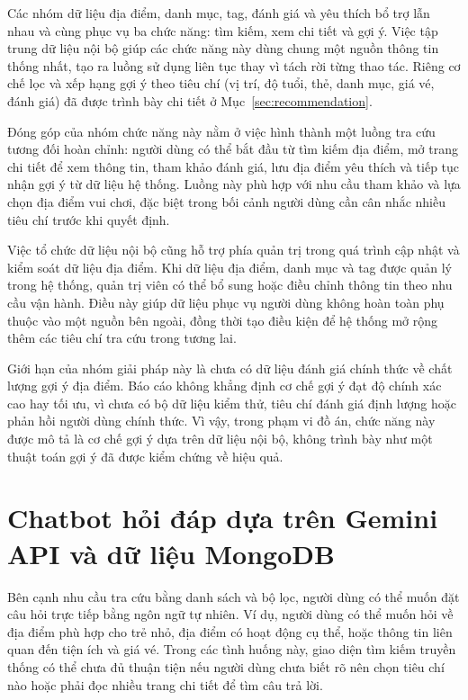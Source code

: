 \documentclass[../DoAn.tex]{subfiles}
\begin{document}
Các nhóm dữ liệu địa điểm, danh mục, tag, đánh giá và yêu thích bổ trợ lẫn nhau và cùng phục vụ ba chức năng: tìm kiếm, xem chi tiết và gợi ý. Việc tập trung dữ liệu nội bộ giúp các chức năng này dùng chung một nguồn thông tin thống nhất, tạo ra luồng sử dụng liên tục thay vì tách rời từng thao tác. Riêng cơ chế lọc và xếp hạng gợi ý theo tiêu chí (vị trí, độ tuổi, thẻ, danh mục, giá vé, đánh giá) đã được trình bày chi tiết ở Mục~\ref{sec:recommendation}.

Đóng góp của nhóm chức năng này nằm ở việc hình thành một luồng tra cứu tương đối hoàn chỉnh: người dùng có thể bắt đầu từ tìm kiếm địa điểm, mở trang chi tiết để xem thông tin, tham khảo đánh giá, lưu địa điểm yêu thích và tiếp tục nhận gợi ý từ dữ liệu hệ thống. Luồng này phù hợp với nhu cầu tham khảo và lựa chọn địa điểm vui chơi, đặc biệt trong bối cảnh người dùng cần cân nhắc nhiều tiêu chí trước khi quyết định.

Việc tổ chức dữ liệu nội bộ cũng hỗ trợ phía quản trị trong quá trình cập nhật và kiểm soát dữ liệu địa điểm. Khi dữ liệu địa điểm, danh mục và tag được quản lý trong hệ thống, quản trị viên có thể bổ sung hoặc điều chỉnh thông tin theo nhu cầu vận hành. Điều này giúp dữ liệu phục vụ người dùng không hoàn toàn phụ thuộc vào một nguồn bên ngoài, đồng thời tạo điều kiện để hệ thống mở rộng thêm các tiêu chí tra cứu trong tương lai.

Giới hạn của nhóm giải pháp này là chưa có dữ liệu đánh giá chính thức về chất lượng gợi ý địa điểm. Báo cáo không khẳng định cơ chế gợi ý đạt độ chính xác cao hay tối ưu, vì chưa có bộ dữ liệu kiểm thử, tiêu chí đánh giá định lượng hoặc phản hồi người dùng chính thức. Vì vậy, trong phạm vi đồ án, chức năng này được mô tả là cơ chế gợi ý dựa trên dữ liệu nội bộ, không trình bày như một thuật toán gợi ý đã được kiểm chứng về hiệu quả.

\section{Chatbot hỏi đáp dựa trên Gemini API và dữ liệu MongoDB}

Bên cạnh nhu cầu tra cứu bằng danh sách và bộ lọc, người dùng có thể muốn đặt câu hỏi trực tiếp bằng ngôn ngữ tự nhiên. Ví dụ, người dùng có thể muốn hỏi về địa điểm phù hợp cho trẻ nhỏ, địa điểm có hoạt động cụ thể, hoặc thông tin liên quan đến tiện ích và giá vé. Trong các tình huống này, giao diện tìm kiếm truyền thống có thể chưa đủ thuận tiện nếu người dùng chưa biết rõ nên chọn tiêu chí nào hoặc phải đọc nhiều trang chi tiết để tìm câu trả lời.
\end{document}
